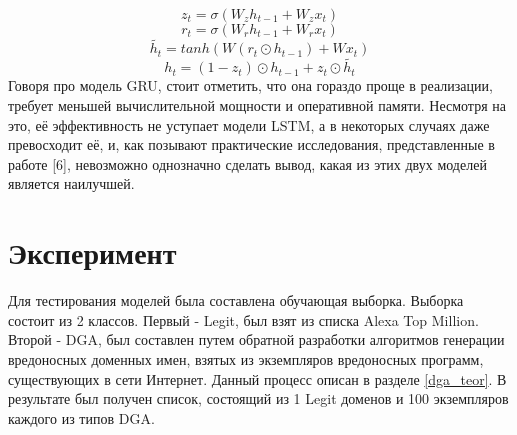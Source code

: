     \begin{equation}\label{gr:1}
    z_{t}=\sigma(W_{z} h_{t-1} + W_{z} x_{t})
    \end{equation}
    \begin{equation}\label{gr:2}
    r_{t}=\sigma(W_{r} h_{t-1} + W_{r} x_{t})
    \end{equation}
    \begin{equation}\label{gr:3}
    \tilde{h_{t}}=tanh(W (r_{t} \odot  h_{t-1}) + W x_{t})
    \end{equation}
    \begin{equation}\label{gr:4}
    h_{t}=(1-z_{t}) \odot  h_{t-1} + z_{t} \odot \tilde{h_{t}}
    \end{equation}
    Говоря про модель GRU, стоит отметить, что она гораздо проще в реализации, требует меньшей вычислительной мощности и оперативной памяти. Несмотря на это, её эффективность не уступает модели LSTM, а в некоторых случаях даже превосходит её, и, как позывают практические исследования, представленные в работе [6], невозможно однозначно сделать вывод, какая из этих двух моделей является наилучшей.
\clearpage

\section{Эксперимент}\label{experiment}
    Для тестирования моделей была составлена обучающая выборка. Выборка состоит из 2 классов. Первый - Legit, был взят из списка Alexa Top Million. Второй - DGA, был составлен путем обратной разработки алгоритмов генерации вредоносных доменных имен, взятых из экземпляров вредоносных программ, существующих в сети Интернет. Данный процесс описан в разделе \ref{dga_teor}. В результате был получен список, состоящий из 1 Legit доменов и 100 экземпляров каждого из типов DGA.
